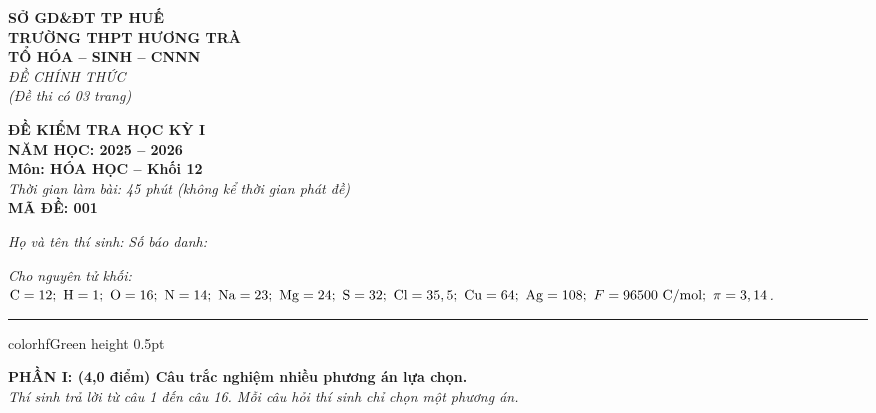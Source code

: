 \documentclass[11pt,a4paper]{article}
\begin{document}
\begin{minipage}[t]{0.48\textwidth}
\textbf{SỞ GD\&ĐT TP HUẾ}\\
\textbf{TRƯỜNG THPT HƯƠNG TRÀ}\\
\textbf{TỔ HÓA -- SINH -- CNNN}\\
\textit{ĐỀ CHÍNH THỨC}\\
\textit{(Đề thi có 03 trang)}
\end{minipage}
\hfill
\begin{minipage}[t]{0.48\textwidth}
\raggedleft
\textbf{\color{hfRed}ĐỀ KIỂM TRA HỌC KỲ I}\\
\textbf{NĂM HỌC: 2025 -- 2026}\\
\textbf{Môn: HÓA HỌC -- Khối 12}\\
\textit{Thời gian làm bài: 45 phút (không kể thời gian phát đề)}\\
\textbf{MÃ ĐỀ: 001}
\end{minipage}

\vspace{4pt}
\noindent
\textit{Họ và tên thí sinh:} \dotfill \textit{Số báo danh:} \dotfill

\vspace{3pt}
\noindent
\textit{\footnotesize Cho nguyên tử khối: $\ce{C}=12;\ \ce{H}=1;\ \ce{O}=16;\ \ce{N}=14;\ \ce{Na}=23;\ \ce{Mg}=24;\ \ce{S}=32;\ \ce{Cl}=35,5;\ \ce{Cu}=64;\ \ce{Ag}=108;\ F = 96500\text{ C/mol};\ \pi = 3,14$.}

\vspace{3pt}
\hrule color{hfGreen} height 0.5pt

\vspace{4pt}
\noindent
{\color{mainGreen}\textbf{\large PHẦN I: (4,0 điểm) Câu trắc nghiệm nhiều phương án lựa chọn.}}\\
\textit{\small Thí sinh trả lời từ câu 1 đến câu 16. Mỗi câu hỏi thí sinh chỉ chọn một phương án.}
\vspace{2pt}
\end{document}
